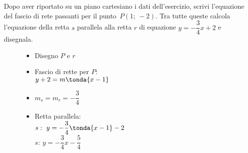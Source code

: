  \begin{esempio}
  Dopo aver riportato su un piano cartesiano i dati dell'esercizio,
  scrivi l'equazione del fascio di rete passanti per il punto~\(P(1;~-2)\).
  Tra tutte queste calcola l'equazione della retta \(s\) parallela alla retta 
  \(r\) di equazione \(y=-\dfrac{3}{4}x+2\) e disegnala.

\begin{inaccessibleblock}
 \begin{figure}[h]
\centering \hspace{-5mm}
 \begin{minipage}[]{.40\textwidth}
  \begin{itemize}
  \item Disegno \(P\) e \(r\)%
  \item Fascio di rette per \(P\): \\
  \(y + 2 = m \tonda{x - 1}\)
  \item \(m_s = m_r = -\dfrac{3}{4}\)
  \item Retta parallela: \\
  \(s:~y = -\dfrac{3}{4} \tonda{x - 1} -2\)\\
  \(s:~y = -\dfrac{3}{4} x -\dfrac{5}{4}\)
  \end{itemize}
 \end{minipage}
 \begin{minipage}[]{.60\textwidth}
   \centering \fascioparall
 \end{minipage}
\label{fig:fascioparall}
\end{figure}
\end{inaccessibleblock}
 \end{esempio}
 
